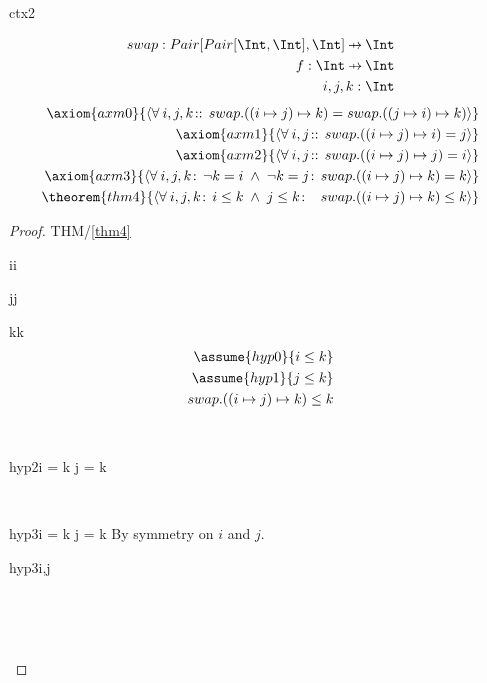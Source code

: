 \documentclass[12pt]{amsart}
\begin{document}
\begin{context}{ctx2}

\begin{align*}
\constant{swap : Pair [Pair [ \Int, \Int ], \Int ] \pfun \Int } \\
\dummy{ f : \Int \pfun \Int } \\
\dummy{ i,j,k : \Int } 
\end{align*}
\begin{align*}
\axiom{axm0}{ \qforall{i,j,k}{}{ swap.((i \mapsto j) \mapsto k) = swap.((j \mapsto i) \mapsto k) } } \\
\axiom{axm1}{ \qforall{i,j}{}{ swap.((i \mapsto j) \mapsto i) = j } } \\
\axiom{axm2}{ \qforall{i,j}{}{ swap.((i \mapsto j) \mapsto j) = i } } \\
\axiom{axm3}{ \qforall{i,j,k}{\neg k = i \1\land \neg k = j}{ swap.((i \mapsto j) \mapsto k) = k } } \\
\theorem{thm4}{ \qforall{i,j,k}{i \le k \1\land j \le k}{  ~ ~ swap.((i \mapsto j) \mapsto k) \le k } } \\
\end{align*}

\begin{proof}{THM/\ref{thm4}}
\begin{free:var}{i}{i}
\begin{free:var}{j}{j}
\begin{free:var}{k}{k}
	\begin{align}
	\assume{hyp0}{i \le k} \\
	\assume{hyp1}{j \le k} \\
	\goal{ swap.((i \mapsto j) \mapsto k) \le k }
	\end{align}
	\noindent
	\begin{by:cases} \\
	\begin{case}{hyp2}{\neg i = k \land \neg j = k}
		\easy
	\end{case} \\
	\begin{case}{hyp3}{i = k \lor j = k}
		By symmetry on $i$ and $j$.
		\begin{by:symmetry}{hyp3}{i,j}
		\easy
		\end{by:symmetry} \\
	\noindent \end{case} \\
	\end{by:cases}
\end{free:var}
\end{free:var}
\end{free:var}
\end{proof}

\end{context}
\end{document}
